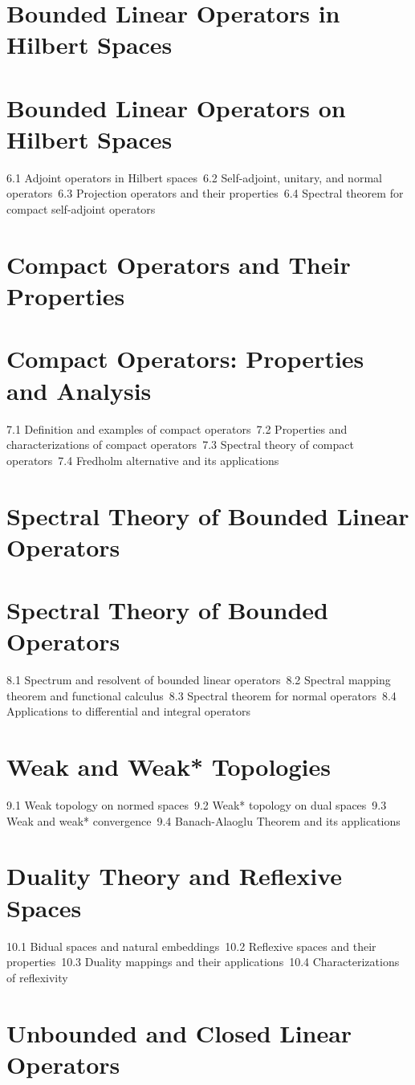 \section{Bounded Linear Operators in Hilbert Spaces}
\section{Bounded Linear Operators on Hilbert Spaces}
6.1 Adjoint operators in Hilbert spaces\
6.2 Self-adjoint, unitary, and normal operators\
6.3 Projection operators and their properties\
6.4 Spectral theorem for compact self-adjoint operators\
\section{Compact Operators and Their Properties}
\section{Compact Operators: Properties and Analysis}
7.1 Definition and examples of compact operators\
7.2 Properties and characterizations of compact operators\
7.3 Spectral theory of compact operators\
7.4 Fredholm alternative and its applications\
\section{Spectral Theory of Bounded Linear Operators}
\section{Spectral Theory of Bounded Operators}
8.1 Spectrum and resolvent of bounded linear operators\
8.2 Spectral mapping theorem and functional calculus\
8.3 Spectral theorem for normal operators\
8.4 Applications to differential and integral operators\
\section{Weak and Weak* Topologies}
9.1 Weak topology on normed spaces\
9.2 Weak* topology on dual spaces\
9.3 Weak and weak* convergence\
9.4 Banach-Alaoglu Theorem and its applications\
\section{Duality Theory and Reflexive Spaces}
10.1 Bidual spaces and natural embeddings\
10.2 Reflexive spaces and their properties\
10.3 Duality mappings and their applications\
10.4 Characterizations of reflexivity\
\section{Unbounded and Closed Linear Operators}
